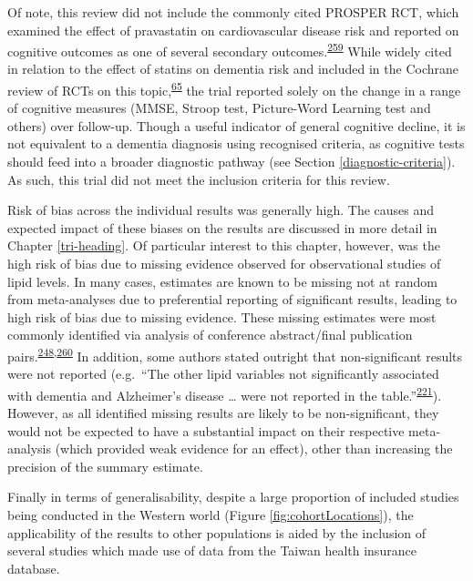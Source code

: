 \documentclass[a4paper, twoside]{templates/ociamthesis}
\begin{document}
Of note, this review did not include the commonly cited PROSPER RCT, which examined the effect of pravastatin on cardiovascular disease risk and reported on cognitive outcomes as one of several secondary outcomes.\textsuperscript{\protect\hyperlink{ref-shepherd2002}{259}} While widely cited in relation to the effect of statins on dementia risk and included in the Cochrane review of RCTs on this topic,\textsuperscript{\protect\hyperlink{ref-mcguinness2016}{65}} the trial reported solely on the change in a range of cognitive measures (MMSE, Stroop test, Picture-Word Learning test and others) over follow-up. Though a useful indicator of general cognitive decline, it is not equivalent to a dementia diagnosis using recognised criteria, as cognitive tests should feed into a broader diagnostic pathway (see Section \ref{diagnostic-criteria}). As such, this trial did not meet the inclusion criteria for this review.

Risk of bias across the individual results was generally high. The causes and expected impact of these biases on the results are discussed in more detail in Chapter \ref{tri-heading}. Of particular interest to this chapter, however, was the high risk of bias due to missing evidence observed for observational studies of lipid levels. In many cases, estimates are known to be missing not at random from meta-analyses due to preferential reporting of significant results, leading to high risk of bias due to missing evidence. These missing estimates were most commonly identified via analysis of conference abstract/final publication pairs.\textsuperscript{\protect\hyperlink{ref-yamada2009}{248},\protect\hyperlink{ref-yamada2009conf}{260}} In addition, some authors stated outright that non-significant results were not reported (e.g.~``The other lipid variables not significantly associated with dementia and Alzheimer's disease \ldots{} were not reported in the table.''\textsuperscript{\protect\hyperlink{ref-ancelin2013}{221}}). However, as all identified missing results are likely to be non-significant, they would not be expected to have a substantial impact on their respective meta-analysis (which provided weak evidence for an effect), other than increasing the precision of the summary estimate.

Finally in terms of generalisability, despite a large proportion of included studies being conducted in the Western world (Figure \ref{fig:cohortLocations}), the applicability of the results to other populations is aided by the inclusion of several studies which made use of data from the Taiwan health insurance database.
\end{document}
